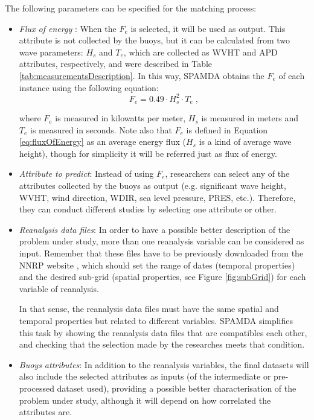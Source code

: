 \documentclass[energies,article,submit,moreauthors,pdftex]{Definitions/mdpi}
\begin{document}
				The following parameters can be specified for the matching process:
				\begin{itemize}[leftmargin=*,labelsep=5.8mm]
				
					\item \textit{Flux of energy} \cite{FERNANDEZ201544}: When the $F_e$ is selected, it will be used as output. This attribute is not collected by the buoys, but it can be calculated from two wave parameters: $H_s$ and $T_e$, which are collected as WVHT and APD attributes, respectively, and were described in Table \ref{tab:measurementsDescription}. In this way, SPAMDA obtains the $F_e$ of each instance using the following equation:
					\begin{equation}
							F_e = 0.49 \cdot H^2_s \cdot T_e \;,
							\label{eq:fluxOfEnergy}
					\end{equation}
						
					where $F_e$ is measured in kilowatts per meter, $H_s$ is measured in meters and $T_e$ is measured in seconds. Note also that $F_e$ is defined in Equation \ref{eq:fluxOfEnergy} as an average energy flux ($H_s$ is a kind of average wave height), though for simplicity it will be referred just as flux of energy.
					
					\item \textit{Attribute to predict}: Instead of using $F_e$, researchers can select any of the attributes collected by the buoys as output (e.g. significant wave height, WVHT, wind direction, WDIR, sea level pressure, PRES, etc.). Therefore, they can conduct different studies by selecting one attribute or other.

					\item \textit{Reanalysis data files}: In order to have a possible better description of the problem under study, more than one reanalysis variable can be considered as input. Remember that these files have to be previously downloaded from the NNRP website \cite{NNRP}, which should set the range of dates (temporal properties) and the desired sub-grid (spatial properties, see Figure \ref{fig:subGrid}) for each variable of reanalysis.
					
					In that sense, the reanalysis data files must have the same spatial and temporal properties but related to different variables. SPAMDA simplifies this task by showing the reanalysis data files that are compatibles each other, and checking that the selection made by the researches meets that condition.
					
					\item \textit{Buoys attributes}: In addition to the reanalysis variables, the final datasets will also include the selected attributes as inputs (of the intermediate or pre-processed dataset used), providing a possible better characterisation of the problem under study, although it will depend on how correlated the attributes are.


\end{itemize}
\end{document}
